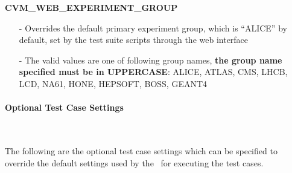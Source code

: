 \begin{description}
\item {\bf CVM\_WEB\_EXPERIMENT\_GROUP}
		\begin{itemize}
		\item[-]	Overrides the default \cernvm primary experiment group, which is ``ALICE''
				by default, set by the test suite scripts through the web interface
		\item[-]	The valid values are one of following group names, {\bf the group name
				specified must be in UPPERCASE}: ALICE, ATLAS, CMS, LHCB, LCD, NA61, HONE,
				HEPSOFT, BOSS, GEANT4	
		\end{itemize}
\end{description}


\paragraph*{Optional Test Case Settings}~\newline

The following are the optional test case settings which can be specified to override
the default settings used by the \cernvmtestframework\ for executing the \cernvmreleasetesting
test cases.

